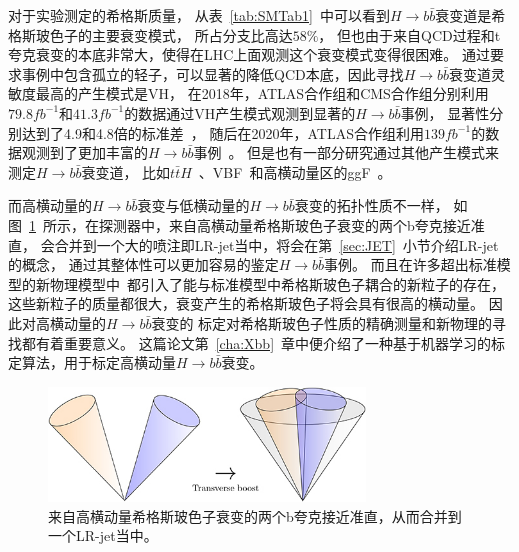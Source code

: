 对于实验测定的希格斯质量，
从表~\ref{tab:SMTab1}~中可以看到$H\rightarrow b\bar{b}$衰变道是希格斯玻色子的主要衰变模式，
所占分支比高达$58\%$，
但也由于来自QCD过程和t夸克衰变的本底非常大，使得在LHC上面观测这个衰变模式变得很困难。
通过要求事例中包含孤立的轻子，可以显著的降低QCD本底，因此寻找$H\rightarrow b\bar{b}$衰变道灵敏度最高的产生模式是VH，
在2018年，ATLAS合作组和CMS合作组分别利用$79.8fb^{-1}$和$41.3fb^{-1}$的数据通过VH产生模式观测到显著的$H\rightarrow b\bar{b}$事例，
显著性分别达到了4.9和4.8倍的标准差~\cite{AHbb8,CHbb3}，
随后在2020年，ATLAS合作组利用$139fb^{-1}$的数据观测到了更加丰富的$H\rightarrow b\bar{b}$事例~\cite{AHbb5}。
但是也有一部分研究通过其他产生模式来测定$H\rightarrow b\bar{b}$衰变道，
比如$t\bar{t}H$~\cite{AHbb7,AHbb8,CHbb1}、VBF~\cite{AHbb6}和高横动量区的ggF~\cite{CHbb3}。

而高横动量的$H\rightarrow b\bar{b}$衰变与低横动量的$H\rightarrow b\bar{b}$衰变的拓扑性质不一样，
如图~\ref{fig:Boosted}~所示，在探测器中，来自高横动量希格斯玻色子衰变的两个b夸克接近准直，
会合并到一个大的喷注即LR-jet当中，将会在第~\ref{sec:JET}~小节介绍LR-jet的概念，
通过其整体性可以更加容易的鉴定$H\rightarrow b\bar{b}$事例。
而且在许多超出标准模型的新物理模型中~\cite{BSMHIGGS1,BSMHIGGS2,BSMHIGGS3}都引入了能与标准模型中希格斯玻色子耦合的新粒子的存在，
这些新粒子的质量都很大，衰变产生的希格斯玻色子将会具有很高的横动量。
因此对高横动量的$H\rightarrow b\bar{b}$衰变的
标定对希格斯玻色子性质的精确测量和新物理的寻找都有着重要意义。
这篇论文第~\ref{cha:Xbb}~章中便介绍了一种基于机器学习的标定算法，用于标定高横动量$H\rightarrow b \bar{b}$衰变。


\begin{figure}
  \begin{center}
    \includegraphics[width=0.75\textwidth]{figuresXbb/Boosted.jpg}
  \end{center}
  \caption{
来自高横动量希格斯玻色子衰变的两个b夸克接近准直，从而合并到一个LR-jet当中。
  }
    \label{fig:Boosted}
\end{figure}







